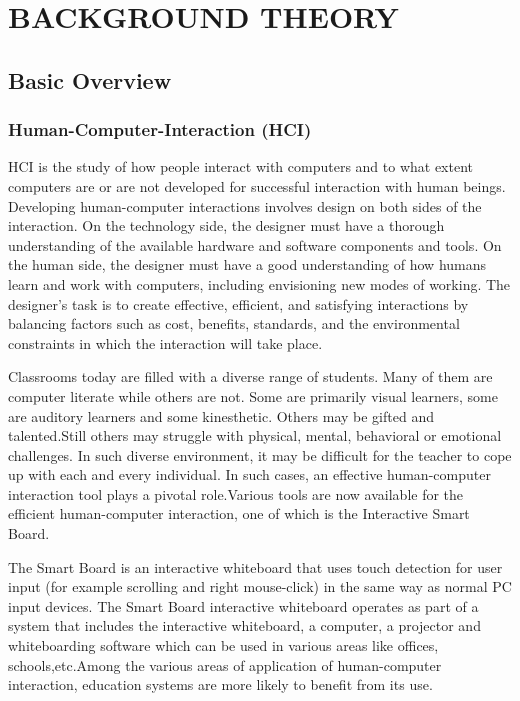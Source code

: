 \documentclass[12pt, a4paper]{article}
\begin{document}
\section{BACKGROUND THEORY}

\subsection{Basic Overview}

\subsubsection{Human-Computer-Interaction (HCI)} 
HCI is the study of how people interact with computers and to what extent computers are or are not developed for successful interaction with human beings. Developing human-computer interactions involves design on both sides of the interaction. On the technology side, the designer must have a thorough understanding of the available hardware and software components and tools. On the human side, the designer must have a good understanding of how humans learn and work with computers, including envisioning new modes of working. The designer's task is to create effective, efficient, and satisfying interactions by balancing factors such as cost, benefits, standards, and the environmental constraints in which the interaction will take place. 

Classrooms today are filled with a diverse range of students. Many of them are computer literate while others are not. Some are primarily visual learners, some are auditory learners and some kinesthetic. Others may be gifted and talented.Still others may struggle with physical, mental, behavioral or emotional challenges. In such diverse environment, it may be difficult for the teacher to cope up with each and every individual. In such cases, an effective human-computer interaction tool plays a pivotal role.Various tools are now available for the efficient human-computer interaction, one of which is the Interactive Smart Board.

The Smart Board is an interactive whiteboard that uses touch detection for user input (for example scrolling and right mouse-click) in the same way as normal PC input devices. The Smart Board interactive whiteboard operates as part of a system that includes the interactive whiteboard, a computer, a projector and whiteboarding software which can be used in various areas like offices, schools,etc.Among the various areas of application of human-computer interaction, education systems are more likely to benefit from its use.
\end{document}
